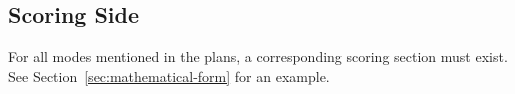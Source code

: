 \subsection{Scoring Side}
For all modes mentioned in the plans, a corresponding scoring section must exist.  See Section~\ref{sec:mathematical-form} for an example.

%
%
%
%
%
%
%

